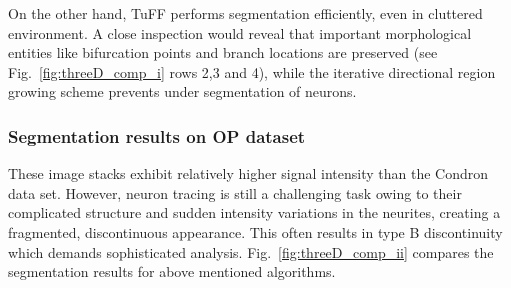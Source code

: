 On the other hand, TuFF performs segmentation efficiently, even in cluttered environment. A close inspection would reveal that important morphological entities like bifurcation points and branch locations are preserved (see Fig.~\ref{fig:threeD_comp_i} rows 2,3 and 4), while the iterative directional region growing scheme prevents under segmentation of neurons. 

\subsubsection{Segmentation results on OP dataset} These image stacks exhibit relatively higher signal intensity than the Condron data set. However, neuron tracing is still a challenging task owing to their complicated structure and sudden intensity variations in the neurites, creating a fragmented, discontinuous appearance. This often results in type B discontinuity which demands sophisticated analysis. Fig.~\ref{fig:threeD_comp_ii} compares the segmentation results for  above mentioned algorithms.

